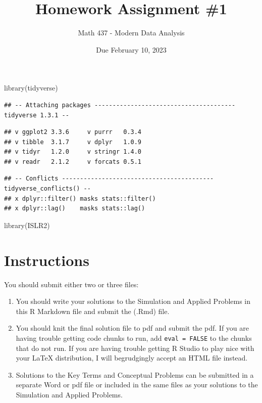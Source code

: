 \documentclass[
]{article}
\title{Homework Assignment \#1}
\author{Math 437 - Modern Data Analysis}
\date{Due February 10, 2023}
\newenvironment{Shaded}{\begin{snugshade}}{\end{snugshade}}
\newcommand{\FunctionTok}[1]{\textcolor[rgb]{0.00,0.00,0.00}{#1}}
\newcommand{\NormalTok}[1]{#1}
\providecommand{\tightlist}{%
  \setlength{\itemsep}{0pt}\setlength{\parskip}{0pt}}
\begin{document}
\maketitle

\begin{Shaded}
\begin{Highlighting}[]
\FunctionTok{library}\NormalTok{(tidyverse)}
\end{Highlighting}
\end{Shaded}

\begin{verbatim}
## -- Attaching packages --------------------------------------- tidyverse 1.3.1 --
\end{verbatim}

\begin{verbatim}
## v ggplot2 3.3.6     v purrr   0.3.4
## v tibble  3.1.7     v dplyr   1.0.9
## v tidyr   1.2.0     v stringr 1.4.0
## v readr   2.1.2     v forcats 0.5.1
\end{verbatim}

\begin{verbatim}
## -- Conflicts ------------------------------------------ tidyverse_conflicts() --
## x dplyr::filter() masks stats::filter()
## x dplyr::lag()    masks stats::lag()
\end{verbatim}

\begin{Shaded}
\begin{Highlighting}[]
\FunctionTok{library}\NormalTok{(ISLR2)}
\end{Highlighting}
\end{Shaded}

\hypertarget{instructions}{%
\section{Instructions}\label{instructions}}

You should submit either two or three files:

\begin{enumerate}
\def\labelenumi{\arabic{enumi}.}
\tightlist
\item
  You should write your solutions to the Simulation and Applied Problems
  in this R Markdown file and submit the (.Rmd) file.
\item
  You should knit the final solution file to pdf and submit the pdf. If
  you are having trouble getting code chunks to run, add
  \texttt{eval\ =\ FALSE} to the chunks that do not run. If you are
  having trouble getting R Studio to play nice with your LaTeX
  distribution, I will begrudgingly accept an HTML file instead.
\item
  Solutions to the Key Terms and Conceptual Problems can be submitted in
  a separate Word or pdf file or included in the same files as your
  solutions to the Simulation and Applied Problems.
\end{enumerate}
\end{document}
